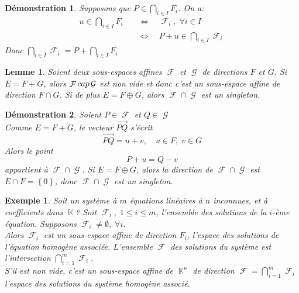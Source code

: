 \documentclass[a4paper, oneside]{report}
\theoremstyle{break}
\newtheorem{lemme}[thm]{Lemme}
\newtheorem{exemple}[thm]{Exemple}
\newtheorem*{demonstration}{Démonstration}
\DeclareMathOperator{\K}{\mathbb{K}}
\DeclareMathOperator{\F}{\mathcal{F}}
\DeclareMathOperator{\G}{\mathcal{G}}
\DeclarePairedDelimiter\ens{\left\{ }{\right\} }%
\renewcommand{\ens}[1]{\left\{ #1 \right\} }%
\newcommand{\ensF}{\F}
\newcommand{\ensG}{\G}
\begin{document}
\begin{demonstration}
Supposons que $P \in \bigcap\limits_{i \in I} F_i$. On a:
\begin{align*}
u \in \bigcap_{i \in I} F_i 	\quad	&\Leftrightarrow	\quad	\ensF_i, \; \forall i \in I
\\
&\Leftrightarrow	\quad	P + u \in \bigcap_{i \in I} \ensF_i
\end{align*}
Donc $\bigcap\limits_{i \in I} \ensF_i = P + \bigcap\limits_{i \in I} F_i$
\end{demonstration}

\begin{lemme}
Soient deux sous-espaces affines $\ensF$ et $\ensG$ de directions $F$ et $G$. Si $E = F  + G$, alors $\ensF \\cap \ensG$ est non vide et donc c'est un sous-espace affine de direction $F \cap G$. Si de plus $E = F \oplus G$, alors $\ensF \cap \ensG$ est un singleton.
\end{lemme}

\begin{demonstration}
Soient $P \in \ensF$ et $Q \in \ensG$\\
Comme $E = F + G$, le vecteur $\vec{PQ}$ s'écrit
\[
\vec{PQ} = u + v,		\quad	u \in F, \; v \in G
\]
Alors le point
\[
P + u = Q - v
\]
appartient à $\ensF \cap \ensG$. Si $E = F \oplus G$, alors la direction de $\ensF \cap \ensG$ est $E \cap F = \ens{0}$, donc $\ensF \cap \ensG$ est un singleton.
\end{demonstration}

\begin{exemple}
Soit un système à $m$ équations linéaires à $n$ inconnues, et à coefficients dans $\K$? Soit $\ensF_i, \; 1 \leq i \leq m$, l'ensemble des solutions de la $i$-ème équation. Supposons $\ensF_i \neq \emptyset, \; \forall i$.\\
Alors $\ensF_i$ est un sous-espace affine de direction $F_i$, l'espace des solutions de l'équation homogène associée. L'ensemble $\ensF$ des solutions du système est l'intersection $\bigcap_{i = 1}^m \ensF_i$.\\
S'il est non vide, c'est un sous-espace affine de $\K^n$ de direction $\ensF = \bigcap_{i = 1}^m \ensF_i$ l'espace des solutions du système homogène associé.
\end{exemple}
\end{document}
